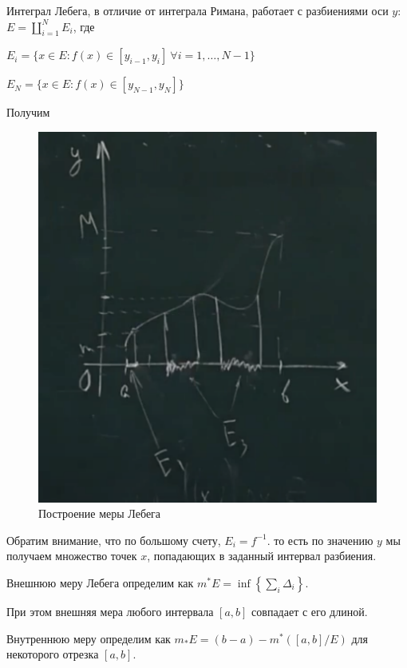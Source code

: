 Интеграл Лебега, в отличие от интеграла Римана, работает
с разбиениями оси $y$: $E = \coprod\limits_{i = 1}^N E_i$, где

$E_i = \{ x \in E: f(x) \in [y_{i - 1}, y_i]~ \forall i = 1, \dots, N - 1\}$

$E_N = \{x \in E: f(x) \in [y_{N - 1}, y_N]\}$

Получим
\begin{figure}[H]
    \centering
    \includegraphics[scale=0.5]{images/lebeg2.png}
    \caption{Построение меры Лебега}
\end{figure}

Обратим внимание, что по большому счету, $E_i = f^{-1}$. то
есть по значению $y$ мы получаем множество точек $x$, попадающих в заданный
интервал разбиения.
\begin{definition}
Внешнюю меру Лебега определим как $m^* E = \inf\left\{\sum\limits_i \Delta_i\right\}$.

При этом внешняя мера любого интервала $[a, b]$ совпадает с его длиной.
        
\end{definition}

\begin{definition}
Внутреннюю меру определим как $m_* E = (b - a) - m^*([a, b] / E)$ для
некоторого отрезка $[a, b]$.    
\end{definition}

